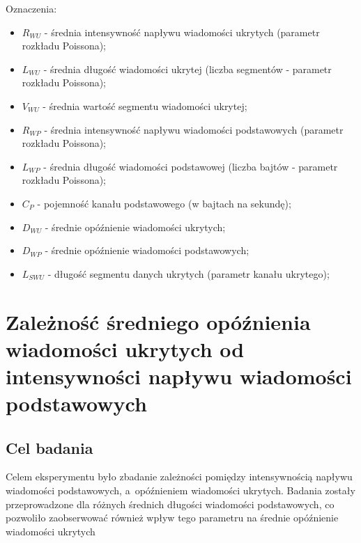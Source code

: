 \documentclass[a4paper, twoside, 12pt]{report}
\begin{document}
    Oznaczenia:
    \begin{itemize} \itemsep1pt \parskip0pt 
        \item \( R_{WU} \) - średnia intensywność napływu wiadomości ukrytych (parametr rozkładu Poissona);
        \item \( L_{WU} \) - średnia długość wiadomości ukrytej (liczba segmentów - parametr rozkładu Poissona);
        \item \( V_{WU} \) - średnia wartość segmentu wiadomości ukrytej;
        \item \( R_{WP} \) - średnia intensywność napływu wiadomości podstawowych (parametr rozkładu Poissona);
        \item \( L_{WP} \) - średnia długość wiadomości podstawowej (liczba bajtów - parametr rozkładu Poissona);
        \item \( C_P \) - pojemność kanału podstawowego (w bajtach na sekundę);
        \item \( D_{WU} \) - średnie opóźnienie wiadomości ukrytych;
        \item \( D_{WP} \) - średnie opóźnienie wiadomości podstawowych;
        \item \( L_{SWU} \) - długość segmentu danych ukrytych (parametr kanału ukrytego);
    \end{itemize}

    \section{Zależność średniego opóźnienia wiadomości ukrytych od intensywności napływu wiadomości podstawowych}
        \subsection{Cel badania}
            Celem eksperymentu było zbadanie zależności pomiędzy intensywnością
            napływu wiadomości podstawowych, a~opóźnieniem wiadomości ukrytych.
            Badania zostały przeprowadzone dla różnych średnich długości wiadomości
            podstawowych, co pozwoliło zaobserwować również wpływ tego parametru
            na średnie opóźnienie wiadomości ukrytych
\end{document}
